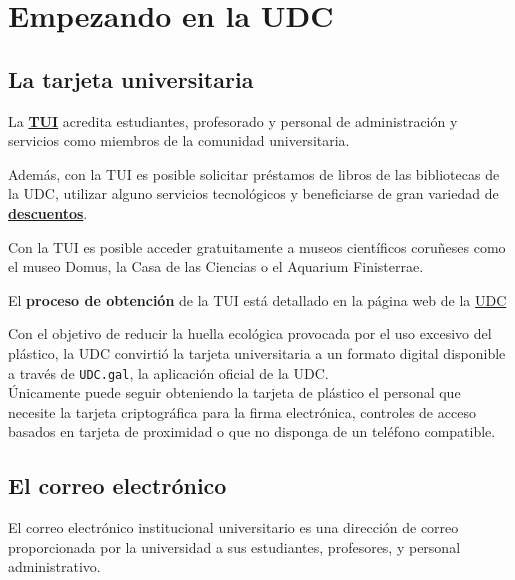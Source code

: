 \chapter{Empezando en la UDC}

\section{La tarjeta universitaria}

La \href{https://www.udc.es/es/tui/}{\textbf{\acrfull{TUI}}} acredita estudiantes, profesorado y personal de administración y servicios como miembros de la comunidad universitaria.

Además, con la \acrshort{TUI} es posible solicitar préstamos de libros de las bibliotecas de la \acrshort{UDC}, utilizar alguno servicios tecnológicos y beneficiarse de gran variedad de \href{https://www.udc.es/es/tui/guias_comerciais/}{\textbf{descuentos}}.

\begin{exampleBox}
    Con la \acrfull{TUI} es posible acceder gratuitamente a museos científicos coruñeses como el museo Domus, la Casa de las Ciencias o el Aquarium Finisterrae.
\end{exampleBox}

El \textbf{proceso de obtención} de la \acrshort{TUI} está detallado en la página web de la \href{https://www.udc.es/es/tui/emision/}{\acrshort{UDC}}

\begin{curiosityBox}
    Con el objetivo de reducir la huella ecológica provocada por el uso excesivo del plástico, la \acrshort{UDC} convirtió la tarjeta universitaria a un formato digital disponible a través de \texttt{UDC.gal}, la aplicación oficial de la \acrshort{UDC}.\\

    Únicamente puede seguir obteniendo la tarjeta de plástico el personal que necesite la tarjeta criptográfica para la firma electrónica, controles de acceso basados en tarjeta de proximidad o que no disponga de un teléfono compatible.
\end{curiosityBox}


\section{El correo electrónico}

El correo electrónico institucional universitario es una dirección de correo proporcionada por la universidad a sus estudiantes, profesores, y personal administrativo.

